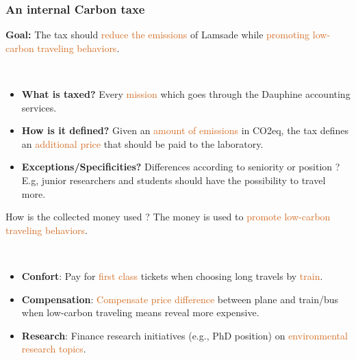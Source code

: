 \documentclass[french,english]{beamer}
\newcommand{\chocolate}[1]{\textcolor{chocolate}{#1}}
\begin{document}


\frame
{
  \frametitle{An internal Carbon taxe}

\textbf{Goal:} The tax should \chocolate{reduce the emissions} of Lamsade while \chocolate{promoting low-carbon traveling behaviors}. 

\

  \begin{itemize}
  \item \textbf{What is taxed?} Every \chocolate{mission} which goes through the Dauphine accounting services.
  \item \textbf{How is it defined?} Given an \chocolate{amount of emissions} in CO2eq, the tax defines an \chocolate{additional price} that should be paid to the laboratory.
  \item \textbf{Exceptions/Specificities?} Differences according to seniority or position ? E.g, junior researchers and students should have the possibility to travel more.
  \end{itemize}
}

\begin{frame}{How is the collected money used ?}
The money is used to \chocolate{promote low-carbon traveling behaviors}.

\

\begin{itemize} 
    \item \textbf{Confort}: Pay for \chocolate{first class} tickets when choosing long travels by \chocolate{train}. 
    \item \textbf{Compensation}: \chocolate{Compensate price difference} between plane and train/bus when low-carbon traveling means reveal more expensive.  
    \item \textbf{Research}: Finance research initiatives (e.g., PhD position) on \chocolate{environmental research topics}.
\end{itemize}	
\end{frame}
\end{document}
